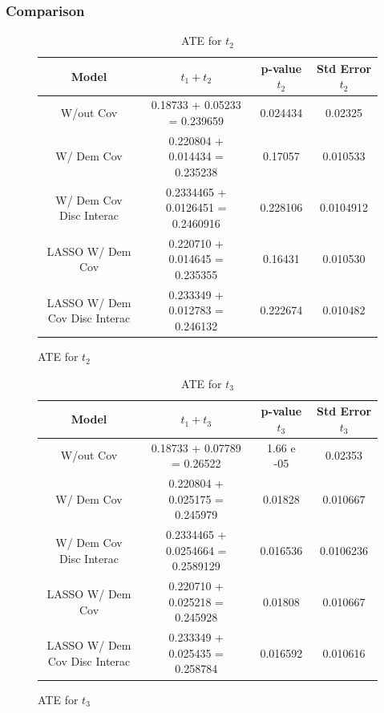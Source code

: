 \documentclass{article}
\begin{document}
\subsubsection*{Comparison}

\begin{figure}[H]
  \begin{table}[H]
  \centering
  \label{tab:}
  \begin{tabular}{|cccc|}
    \hline
    Model & $t_1 + t_2$ & p-value $t_2$ & Std Error $t_2$ \\
    \hline
    W/out Cov                & 0.18733 + 0.05233 = 0.239659 & 0.024434         & 0.02325 \\ 
    W/ Dem Cov               & 0.220804 + 0.014434 = 0.235238 & 0.17057        & 0.010533 \\   
    W/ Dem Cov Disc Interac  & 0.2334465 + 0.0126451 = 0.2460916 & 0.228106    & 0.0104912 \\       
    LASSO W/ Dem Cov               & 0.220710 + 0.014645 = 0.235355 & 0.16431  & 0.010530 \\         
    LASSO W/ Dem Cov Disc Interac  & 0.233349 + 0.012783 = 0.246132 & 0.222674 & 0.010482 \\         
    \hline
  \end{tabular}
  \caption{ATE for $t_2$}
\end{table}
\end{figure}

\begin{figure}[H]
\begin{table}[H]
  \centering
  \label{tab:}
  \begin{tabular}{|cccc|}
    \hline
    Model & $t_1 + t_3$ & p-value $t_3$ & Std Error $t_3$ \\
    \hline
    W/out Cov                & 0.18733 + 0.07789 = 0.26522 & 1.66 e -05        & 0.02353 \\
    W/ Dem Cov               & 0.220804 + 0.025175 = 0.245979 & 0.01828        & 0.010667 \\
    W/ Dem Cov Disc Interac  & 0.2334465 + 0.0254664 = 0.2589129 & 0.016536    & 0.0106236 \\
    LASSO W/ Dem Cov               & 0.220710 + 0.025218 = 0.245928 & 0.01808  & 0.010667 \\
    LASSO W/ Dem Cov Disc Interac  & 0.233349 + 0.025435 = 0.258784 & 0.016592 & 0.010616  \\
    \hline
  \end{tabular}
  \caption{ATE for $t_3$}
\end{table}
\end{figure}
\end{document}

